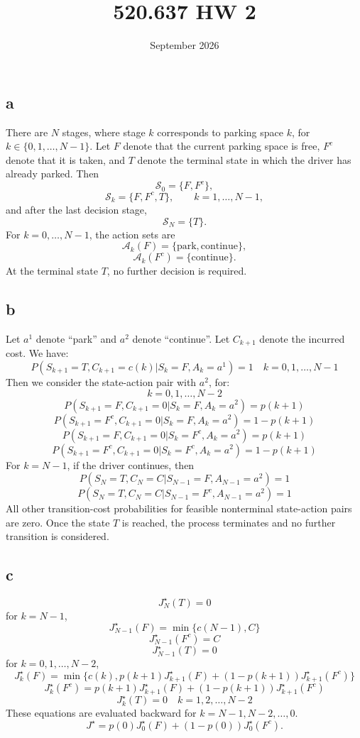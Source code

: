 \documentclass{article}
\title{520.637 HW 2}
\author{}
\date{September 2026}
\begin{document}
\maketitle

\section{}
\subsection*{a} 
There are $N$ stages, where stage $k$ corresponds to parking space
$k$, for $k\in\{0,1,\ldots,N-1\}$.
Let $F$ denote that the current parking space is free, $F^c$ denote
that it is taken, and $T$ denote the terminal state in which the driver
has already parked. Then
\[\mathcal S_0=\{F,F^c\},\]
\[\mathcal S_k=\{F,F^c,T\}, \qquad k=1,\ldots,N-1, \]
and after the last decision stage,
\[\mathcal S_N=\{T\}. \]
For $k=0,\ldots,N-1$, the action sets are
\[ \mathcal A_k(F)=\{\text{park},\text{continue}\}, \]
\[\mathcal A_k(F^c)=\{\text{continue}\}. \]
At the terminal state $T$, no further decision is required.
\subsection*{b}
Let $a^1$ denote ``park'' and $a^2$ denote ``continue''. Let $C_{k+1}$ denote the incurred cost.
We have:\[P(S_{k+1}=T, C_{k+1}=c(k)|S_k=F,A_k=a^1)=1 \quad k= 0,1,\dots,{N-1}\]
Then we consider the state-action pair with $a^2$, for:
\[k=0,1,\ldots,{N-2}\]
\[P(S_{k+1}=F, C_{k+1}=0|S_k=F, A_k=a^2)=p(k+1)\]
\[P(S_{k+1}=F^c, C_{k+1}=0|S_k=F, A_k=a^2)=1-p(k+1)\]
\[P(S_{k+1}=F, C_{k+1}=0|S_k=F^c, A_k=a^2)=p(k+1)\]
\[P(S_{k+1}=F^c, C_{k+1}=0|S_k=F^c, A_k=a^2)=1-p(k+1)\]
For $k=N-1$, if the driver continues, then
\[P(S_N=T, C_N=C|S_{N-1}=F,A_{N-1}=a^2)=1\]
\[P(S_N=T, C_N=C|S_{N-1}=F^c,A_{N-1}=a^2)=1\]
All other transition-cost probabilities for feasible nonterminal
state-action pairs are zero. Once the state $T$ is reached, the process
terminates and no further transition is considered.
\subsection*{c}
\[J^{\star}_N(T)=0\]
for $k={N-1}$, \[J^{\star}_{N-1}(F)=\min \{c(N-1),C\}\]
\[J^{\star}_{N-1}(F^c)=C\]
\[J^{\star}_{N-1}(T)=0\]
for $k=0,1,\ldots, {N-2}$,
\[J^{\star}_{k}(F)=\min\{c(k),p(k+1) J^{\star}_{k+1}(F)+(1-p(k+1))J^{\star}_{k+1}(F^c) \}\]
\[J^{\star}_{k}(F^c)= p(k+1) J^{\star}_{k+1}(F)+(1-p(k+1))J^{\star}_{k+1}(F^c)\]
\[J^{\star}_{k}(T)=0 \quad k= 1,2,\ldots,{N-2}\]
These equations are evaluated backward for
$k=N-1,N-2,\ldots,0$.
\[J^\star = p(0)J_0^\star(F) + (1-p(0))J_0^\star(F^c). \]
\end{document}
